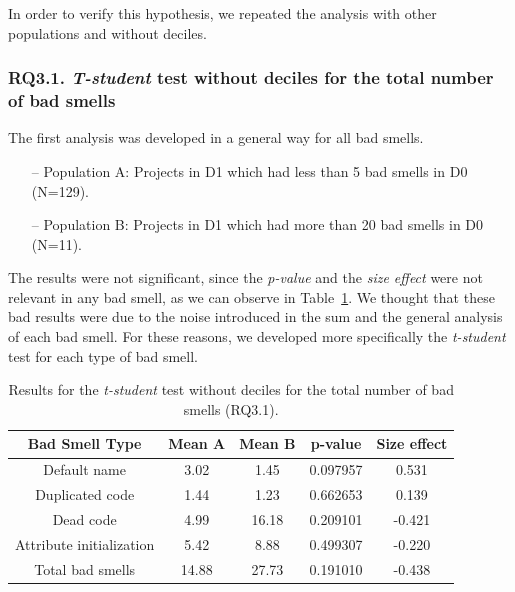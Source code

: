 In order to verify this hypothesis, we repeated the analysis with other populations and without deciles.



\subsubsection{RQ3.1. \textit{T-student} test without deciles for the total number of bad smells}
\label{subsubsec:RQ3_1_statistical_results}

The first analysis was developed in a general way for all bad smells.

\begin{itemize}
    \item[--] Population A: Projects in D1 which had less than 5 bad smells in D0 (N=129).
    \item[--] Population B: Projects in D1 which had more than 20 bad smells in D0 (N=11).
\end{itemize}


The results were not significant, since the \textit{p-value} and the \textit{size effect} were not relevant in any bad smell, as we can observe in Table~\ref{table:rq3_1_statistical_results}. We thought that these bad results were due to the noise introduced in the sum and the general analysis of each bad smell. For these reasons, we developed more specifically the \textit{t-student} test for each type of bad smell. 

\begin{table}
 \begin{center}
  \begin{tabular}{|c|c|c|c|c|}
    \hline
    \textbf{Bad Smell Type} & \textbf{Mean A} & \textbf{Mean B} & \textbf{p-value} & \textbf{Size effect} \\ \hline
    Default name & 3.02 & 1.45 & 0.097957 & 0.531 \\ \hline
    Duplicated code & 1.44 & 1.23 & 0.662653 & 0.139 \\ \hline
    Dead code & 4.99 & 16.18 & 0.209101 & -0.421 \\ \hline
    Attribute initialization & 5.42 & 8.88 & 0.499307 & -0.220 \\ \hline
    Total bad smells & 14.88 & 27.73 & 0.191010 & -0.438 \\ \hline
  \end{tabular}
  \caption{Results for the \textit{t-student} test without deciles for the total number of bad smells (RQ3.1).}
  \label{table:rq3_1_statistical_results}
 \end{center}
\end{table}

